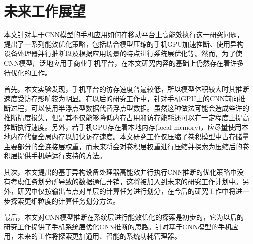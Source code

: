 \section{未来工作展望}
本文针对基于CNN模型的手机应用如何在移动平台上高能效执行这一研究问题，提出了一系列能效优化策略，包括结合模型压缩的手机GPU加速推断、使用异构设备处理器并行推断以及根据应用场景的特点进行系统层优化等。然而，为了使CNN模型广泛地应用于商业手机平台，在本文研究内容的基础上仍然存在着许多待优化的工作。

首先，本文实验发现，手机平台的访存速度普遍较低，所以模型体积较大时其推断速度受访存影响较为明显。在以后的研究工作中，针对手机GPU上的CNN前向推断过程，可以使用半浮点型数据代替浮点型数据。虽然这种做法可能会造成些许的推断精度损失，但是其不仅能够降低内存占用和访存能耗还可以在一定程度上提高推断执行速度。另外，若手机GPU存在着本地内存(local memory)，应尽量使用本地内存代替全局内存以加快访存速度。本文研究工作仅压缩了卷积模型中占存储量主要部分的全连接层权重，而未来将会对卷积层权重进行压缩并探索为压缩后的卷积层提供手机端运行支持的方法。

其次，本文提出的基于异构设备处理器高能效并行执行CNN推断的优化策略中没有考虑任务划分所导致的数据通信开销，这将被加入到未来的研究工作计划中。另外，研究中仅按输出节点对单层的计算任务进行划分，在今后的研究工作中将进一步探索更细粒度的计算任务划分方法。

最后，本文对CNN模型推断在系统层进行能效优化的探索是初步的，它为以后的研究工作提供了手机系统层优化CNN推断的思路。针对基于CNN模型的手机应用，未来的工作将探索更加通用、智能的系统功耗管理器。
\cleardoublepage 